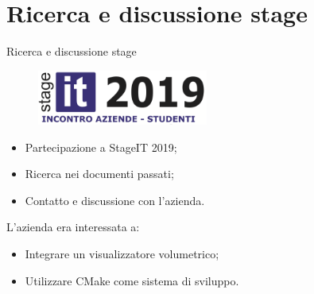 \documentclass{beamer}
\begin{document}
	\section{Ricerca e discussione stage}
	\begin{frame}{Ricerca e discussione stage}
	
	\begin{figure}[ht]
    	\centering
    	\includegraphics[width=0.5\textwidth]{Images/stageit2019.png}
	\end{figure}
	
	\begin{itemize}
		\item Partecipazione a StageIT 2019;
		\item Ricerca nei documenti passati;
		\item Contatto e discussione con l'azienda.
	\end{itemize}
	
	L'azienda era interessata a:
	\begin{itemize}
		\item Integrare un visualizzatore volumetrico;
		\item Utilizzare CMake come sistema di sviluppo.
	\end{itemize}
	
	\end{frame}
	
	
\end{document}
